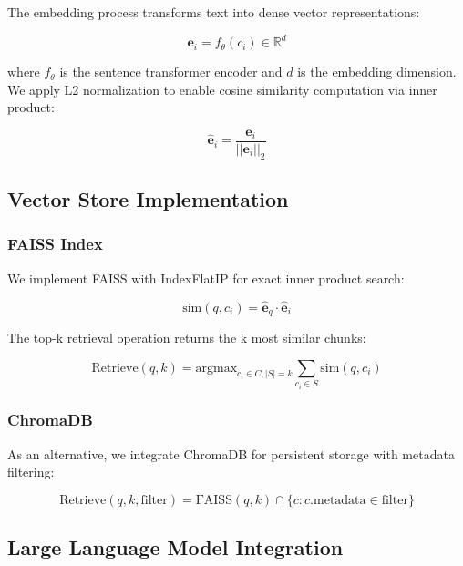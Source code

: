 \documentclass[runningheads]{llncs}
\begin{document}
The embedding process transforms text into dense vector representations:

\begin{equation}
\mathbf{e}_i = f_\theta(c_i) \in \mathbb{R}^d
\end{equation}

where $f_\theta$ is the sentence transformer encoder and $d$ is the embedding dimension. We apply L2 normalization to enable cosine similarity computation via inner product:

\begin{equation}
\hat{\mathbf{e}}_i = \frac{\mathbf{e}_i}{||\mathbf{e}_i||_2}
\end{equation}

\subsection{Vector Store Implementation}

\subsubsection{FAISS Index}

We implement FAISS with IndexFlatIP for exact inner product search:

\begin{equation}
\text{sim}(q, c_i) = \hat{\mathbf{e}}_q \cdot \hat{\mathbf{e}}_i
\end{equation}

The top-k retrieval operation returns the k most similar chunks:

\begin{equation}
\text{Retrieve}(q, k) = \text{argmax}_{c_i \in C, |S| = k} \sum_{c_i \in S} \text{sim}(q, c_i)
\end{equation}

\subsubsection{ChromaDB}

As an alternative, we integrate ChromaDB for persistent storage with metadata filtering:

\begin{equation}
\text{Retrieve}(q, k, \text{filter}) = \text{FAISS}(q, k) \cap \{c : c.\text{metadata} \in \text{filter}\}
\end{equation}

\subsection{Large Language Model Integration}
\end{document}
